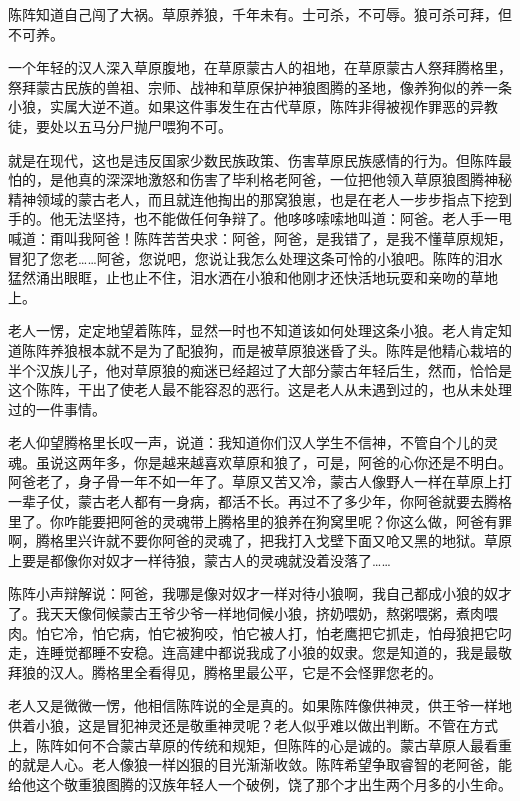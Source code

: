 \par 陈阵知道自己闯了大祸。草原养狼，千年未有。士可杀，不可辱。狼可杀可拜，但不可养。
\par 一个年轻的汉人深入草原腹地，在草原蒙古人的祖地，在草原蒙古人祭拜腾格里，祭拜蒙古民族的兽祖、宗师、战神和草原保护神狼图腾的圣地，像养狗似的养一条小狼，实属大逆不道。如果这件事发生在古代草原，陈阵非得被视作罪恶的异教徒，要处以五马分尸抛尸喂狗不可。
\par 就是在现代，这也是违反国家少数民族政策、伤害草原民族感情的行为。但陈阵最怕的，是他真的深深地激怒和伤害了毕利格老阿爸，一位把他领入草原狼图腾神秘精神领域的蒙古老人，而且就连他掏出的那窝狼崽，也是在老人一步步指点下挖到手的。他无法坚持，也不能做任何争辩了。他哆哆嗦嗦地叫道：阿爸。老人手一甩喊道：甭叫我阿爸！陈阵苦苦央求：阿爸，阿爸，是我错了，是我不懂草原规矩，冒犯了您老……阿爸，您说吧，您说让我怎么处理这条可怜的小狼吧。陈阵的泪水猛然涌出眼眶，止也止不住，泪水洒在小狼和他刚才还快活地玩耍和亲吻的草地上。
\par 老人一愣，定定地望着陈阵，显然一时也不知道该如何处理这条小狼。老人肯定知道陈阵养狼根本就不是为了配狼狗，而是被草原狼迷昏了头。陈阵是他精心栽培的半个汉族儿子，他对草原狼的痴迷已经超过了大部分蒙古年轻后生，然而，恰恰是这个陈阵，干出了使老人最不能容忍的恶行。这是老人从未遇到过的，也从未处理过的一件事情。
\par 老人仰望腾格里长叹一声，说道：我知道你们汉人学生不信神，不管自个儿的灵魂。虽说这两年多，你是越来越喜欢草原和狼了，可是，阿爸的心你还是不明白。阿爸老了，身子骨一年不如一年了。草原又苦又冷，蒙古人像野人一样在草原上打一辈子仗，蒙古老人都有一身病，都活不长。再过不了多少年，你阿爸就要去腾格里了。你咋能要把阿爸的灵魂带上腾格里的狼养在狗窝里呢？你这么做，阿爸有罪啊，腾格里兴许就不要你阿爸的灵魂了，把我打入戈壁下面又呛又黑的地狱。草原上要是都像你对奴才一样待狼，蒙古人的灵魂就没着没落了……
\par 陈阵小声辩解说：阿爸，我哪是像对奴才一样对待小狼啊，我自己都成小狼的奴才了。我天天像伺候蒙古王爷少爷一样地伺候小狼，挤奶喂奶，熬粥喂粥，煮肉喂肉。怕它冷，怕它病，怕它被狗咬，怕它被人打，怕老鹰把它抓走，怕母狼把它叼走，连睡觉都睡不安稳。连高建中都说我成了小狼的奴隶。您是知道的，我是最敬拜狼的汉人。腾格里全看得见，腾格里最公平，它是不会怪罪您老的。
\par 老人又是微微一愣，他相信陈阵说的全是真的。如果陈阵像供神灵，供王爷一样地供着小狼，这是冒犯神灵还是敬重神灵呢？老人似乎难以做出判断。不管在方式上，陈阵如何不合蒙古草原的传统和规矩，但陈阵的心是诚的。蒙古草原人最看重的就是人心。老人像狼一样凶狠的目光渐渐收敛。陈阵希望争取睿智的老阿爸，能给他这个敬重狼图腾的汉族年轻人一个破例，饶了那个才出生两个月多的小生命。
